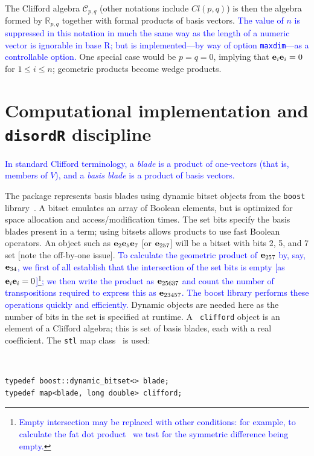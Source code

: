 \documentclass{birkjour}
\theoremstyle{definition}
\theoremstyle{remark}
\numberwithin{equation}{section}
\begin{document}
The Clifford algebra ${\mathcal C}_{p,q}$ (other notations include
$Cl(p,q)$) is then the algebra formed by $\mathbb{R}_{p,q}$ together
with formal products of basis vectors. \textcolor{blue}{The value of
  $n$ is suppressed in this notation in much the same way as the
  length of a numeric vector is ignorable in base R; but is
  implemented---by way of option {\tt maxdim}---as a controllable
  option.}  One special case would be $p=q=0$, implying that
${\bf e}_{i}{\bf e}_{i}=0$ for $1\leqslant i\leqslant n$; geometric products
become wedge products.

\section{Computational implementation and {\tt disordR} discipline}

\textcolor{blue}{ In standard Clifford terminology, a {\em blade} is a
  product of one-vectors (that is, members of $V$), and a {\em basis
    blade} is a product of basis vectors.}

The package represents basis blades using dynamic bitset objects from
the {\tt boost} library~\textcolor{blue}{\cite{karlsson2005}}.  A
bitset emulates an array of Boolean elements, but is optimized for
space allocation and access/modification times.  The set bits specify
the basis blades present in a term; using bitsets allows products to
use fast Boolean operators.  An object such as ${\bf e}_{2}{\bf e}_{5}{\bf e}_{7}$
[or ${\bf e}_{257}$] will be a bitset with bits 2, 5, and 7 set [note the
  off-by-one issue].  \textcolor{blue}{To calculate the geometric
  product of ${\bf e}_{257}$ by, say, ${\bf e}_{34}$, we first of all establish
  that the intersection of the set bits is empty [as
    ${\bf e}_{i}{\bf e}_{i}=0$]\footnote{\textcolor{blue}{Empty intersection may
    be replaced with other conditions: for example, to calculate the
    fat dot product~\cite{dorst2002} we test for the symmetric
    difference being empty.}}; we then write the product as
  ${\bf e}_{25637}$ and count the number of transpositions required to
  express this as ${\bf e}_{23457}$.  The boost library performs these
  operations quickly and efficiently.} Dynamic objects are needed here
as the number of bits in the set is specified at runtime.  A {\tt
  clifford} object is an element of a Clifford algebra; this is set of
basis blades, each with a real coefficient.  The {\tt stl} map
class~\cite{musser2009} is used:

{\ }\\[10pt]
\begin{verbatim}
typedef boost::dynamic_bitset<> blade;
typedef map<blade, long double> clifford;
\end{verbatim}
\end{document}
